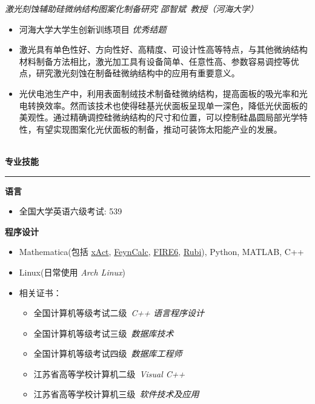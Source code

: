 \documentclass[12pt]{article}
\newcommand{\sect}[1]{
    ~\\ \noindent \textbf{#1} \medskip \hrule \medskip
}
\begin{document}
\smallskip \quad \textit{激光刻蚀辅助硅微纳结构图案化制备研究 \hfill 邵智斌\ 教授（河海大学）}

\begin{itemize}[noitemsep,nolistsep]
    \item 河海大学大学生创新训练项目 \textit{优秀结题}
    \item 激光具有单色性好、方向性好、高精度、可设计性高等特点，与其他微纳结构材料制备方法相比，激光加工具有设备简单、任意性高、参数容易调控等优点，研究激光刻蚀在制备硅微纳结构中的应用有重要意义。
    \item 光伏电池生产中，利用表面制绒技术制备硅微纳结构，提高面板的吸光率和光电转换效率。然而该技术也使得硅基光伏面板呈现单一深色，降低光伏面板的美观性。通过精确调控硅微纳结构的尺寸和位置，可以控制硅晶圆局部光学特性，有望实现图案化光伏面板的制备，推动可装饰太阳能产业的发展。
\end{itemize}


\sect{专业技能}

\textbf{语言}
\begin{itemize}[noitemsep,nolistsep]
    \item 全国大学英语六级考试: 539
\end{itemize}

\textbf{程序设计}
\begin{itemize}[noitemsep,nolistsep]
    \item Mathematica(包括 \href{http://xact.es/index.html}{xAct}, \href{https://feyncalc.github.io/}{FeynCalc}, \href{https://arxiv.org/abs/1901.07808}{FIRE6}, \href{https://rulebasedintegration.org/}{Rubi}), Python, MATLAB, C++
    \item Linux(日常使用 \textit{Arch Linux})
    \item 相关证书：\begin{itemize}[noitemsep,nolistsep]
              \item 全国计算机等级考试二级\ \textit{C++ 语言程序设计}
              \item 全国计算机等级考试三级\ \textit{数据库技术}
              \item 全国计算机等级考试四级\ \textit{数据库工程师}
              \item 江苏省高等学校计算机二级\ \textit{Visual C++}
              \item 江苏省高等学校计算机三级\ \textit{软件技术及应用}
          \end{itemize}
\end{itemize}
\end{document}
